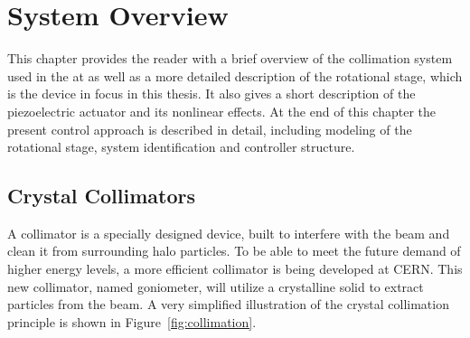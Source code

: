 \chapter{System Overview}\label{cha:systemOverview}
This chapter provides the reader with a brief overview of the collimation system used in the \abbrLHC at \abbrCERN as well as a more detailed description of the rotational stage, which is the device in focus in this thesis. It also gives a short description of the piezoelectric actuator and its nonlinear effects. At the end of this chapter the present control approach is described in detail, including modeling of the rotational stage, system identification and controller structure.

\section{Crystal Collimators}
A collimator is a specially designed device, built to interfere with the beam and clean it from surrounding halo particles. To be able to meet the future demand of higher energy levels, a more efficient collimator is being developed at CERN. This new collimator, named goniometer, will utilize a crystalline solid to extract particles from the beam. A very simplified illustration of the crystal collimation principle is shown in Figure~\ref{fig:collimation}.

